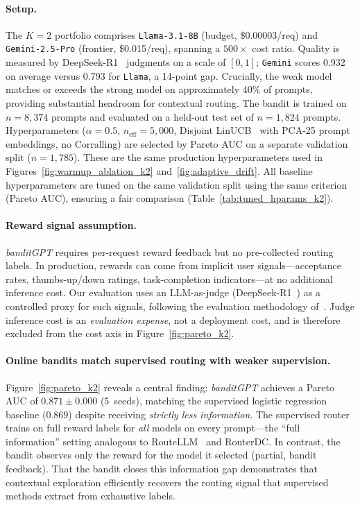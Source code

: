 
\paragraph{Setup.}
The $K{=}2$ portfolio comprises \texttt{Llama-3.1-8B} (budget,
\$0.00003/req) and \texttt{Gemini-2.5-Pro} (frontier, \$0.015/req),
spanning a $500{\times}$ cost ratio.
Quality is measured by DeepSeek-R1~\cite{deepseekai2025deepseekr1}
judgments on a scale of $[0,1]$;
\texttt{Gemini} scores 0.932 on average versus 0.793 for \texttt{Llama},
a 14-point gap.  Crucially, the weak model matches or exceeds the
strong model on approximately 40\% of prompts, providing substantial
headroom for contextual routing.
The bandit is trained on $n{=}8{,}374$ prompts and evaluated on a
held-out test set of $n{=}1{,}824$ prompts.  Hyperparameters
($\alpha{=}0.5$, $n_{\mathrm{eff}}{=}5{,}000$, Disjoint
LinUCB~\cite{li2010contextual} with PCA-25 prompt
embeddings, no Corralling) are selected by Pareto AUC on a separate
validation split ($n{=}1{,}785$).
These are the same production hyperparameters used in Figures~\ref{fig:warmup_ablation_k2}
and~\ref{fig:adaptive_drift}.
All baseline hyperparameters are tuned on the same validation split
using the same criterion (Pareto AUC), ensuring a fair comparison
(Table~\ref{tab:tuned_hparams_k2}).

\paragraph{Reward signal assumption.}
\label{sec:reward_assumption}
\textit{banditGPT} requires per-request reward feedback but no
pre-collected routing labels.  In production, rewards can come from
implicit user signals---acceptance rates, thumbs-up/down ratings,
task-completion indicators---at no additional inference cost.
Our evaluation uses an LLM-as-judge
(DeepSeek-R1~\cite{deepseekai2025deepseekr1}) as a controlled
proxy for such signals, following the evaluation methodology
of~\citet{zheng2024llmjudge}.
Judge inference cost is an \emph{evaluation expense}, not a deployment
cost, and is therefore excluded from the cost axis in
Figure~\ref{fig:pareto_k2}.

\paragraph{Online bandits match supervised routing with weaker supervision.}
Figure~\ref{fig:pareto_k2} reveals a central finding:
\textit{banditGPT} achieves a Pareto AUC of
$0.871 \pm 0.000$ (5~seeds), matching the supervised logistic
regression baseline ($0.869$) despite receiving \emph{strictly less
information}.
The supervised router trains on full reward labels for \emph{all}
models on every prompt---the ``full information'' setting analogous
to RouteLLM~\cite{ong2024routellm} and RouterDC\@.
In contrast, the bandit observes only the reward for the model it
selected (partial, bandit feedback).
That the bandit closes this information gap demonstrates that
contextual exploration efficiently recovers the routing signal
that supervised methods extract from exhaustive labels.

